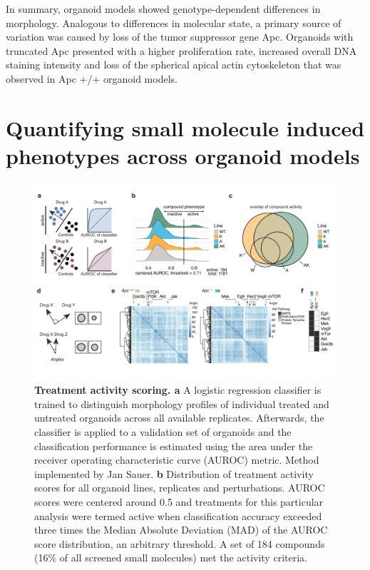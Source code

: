 \begin{flushleft}
\bigbreak
In summary, organoid models showed genotype-dependent differences in morphology. Analogous to differences in molecular state, a primary source of variation was caused by loss of the tumor suppressor gene Apc. Organoids with truncated Apc presented with a higher proliferation rate, increased overall DNA staining intensity and loss of the spherical apical actin cytoskeleton that was observed in Apc +/+ organoid models.

\section{Quantifying small molecule induced phenotypes across organoid models}

\begin{figure}[h!]
\centering
\includegraphics[width=\textwidth,
                height=\textheight,
                keepaspectratio]{figures/adenomaprofiling/pdf/fig_1_5.pdf}
\caption{\textbf{Treatment activity scoring. a} A logistic regression classifier is trained to distinguish morphology profiles of individual treated and untreated organoids across all available replicates. Afterwards, the classifier is applied to a validation set of organoids and the classification performance is estimated using the area under the receiver operating characteristic curve (AUROC) metric. Method implemented by Jan Sauer.
\textbf{b} Distribution of treatment activity scores for all organoid lines, replicates and perturbations. AUROC scores were centered around 0.5 and treatments for this particular analysis were termed active when classification accuracy exceeded three times the Median Absolute Deviation (MAD) of the AUROC score distribution, an arbitrary threshold. A set of 184 compounds (16\% of all screened small molecules) met the activity criteria. 
}
\end{figure}
\end{flushleft}
